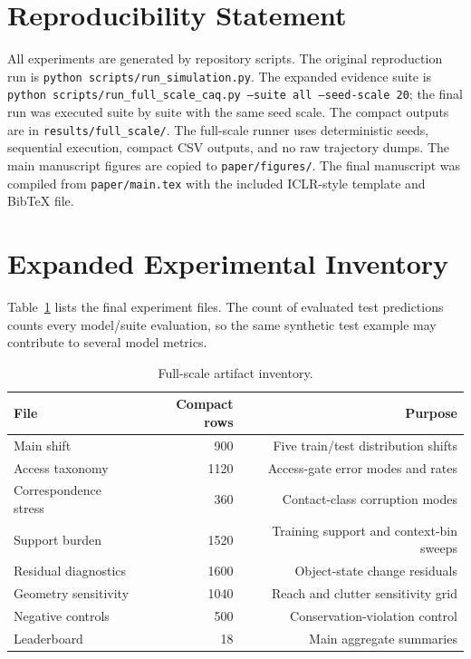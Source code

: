 \documentclass{article}
\begin{document}
\section*{Reproducibility Statement}

All experiments are generated by repository scripts. The original reproduction run is \texttt{python scripts/run\_simulation.py}. The expanded evidence suite is \texttt{python scripts/run\_full\_scale\_caq.py --suite all --seed-scale 20}; the final run was executed suite by suite with the same seed scale. The compact outputs are in \texttt{results/full\_scale/}. The full-scale runner uses deterministic seeds, sequential execution, compact CSV outputs, and no raw trajectory dumps. The main manuscript figures are copied to \texttt{paper/figures/}. The final manuscript was compiled from \texttt{paper/main.tex} with the included ICLR-style template and BibTeX file.




\appendix

\section{Expanded Experimental Inventory}

Table~\ref{tab:inventory} lists the final experiment files. The count of evaluated test predictions counts every model/suite evaluation, so the same synthetic test example may contribute to several model metrics.

\begin{table}[h]
\centering
\caption{Full-scale artifact inventory.}
\label{tab:inventory}
\begin{tabular}{lrr}
\toprule
File & Compact rows & Purpose \\
\midrule
Main shift & 900 & Five train/test distribution shifts \\
Access taxonomy & 1120 & Access-gate error modes and rates \\
Correspondence stress & 360 & Contact-class corruption modes \\
Support burden & 1520 & Training support and context-bin sweeps \\
Residual diagnostics & 1600 & Object-state change residuals \\
Geometry sensitivity & 1040 & Reach and clutter sensitivity grid \\
Negative controls & 500 & Conservation-violation control \\
Leaderboard & 18 & Main aggregate summaries \\
\bottomrule
\end{tabular}
\end{table}
\end{document}
